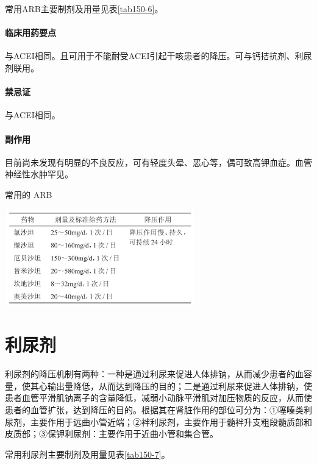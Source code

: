 常用ARB主要制剂及用量见表\ref{tab150-6}。

\paragraph{临床用药要点}

与ACEI相同。且可用于不能耐受ACEI引起干咳患者的降压。可与钙拮抗剂、利尿剂联用。

\paragraph{禁忌证}

与ACEI相同。

\paragraph{副作用}

目前尚未发现有明显的不良反应，可有轻度头晕、恶心等，偶可致高钾血症。血管神经性水肿罕见。

\begin{table}[htbp]
\centering
\caption{常用的 ARB}
\label{tab150-6}
\includegraphics[width=3.25in,height=1.65625in]{./images/Image00562.jpg}
\end{table}

\protect\hypertarget{text00413.html}{}{}

\section{利尿剂}

利尿剂的降压机制有两种：一种是通过利尿来促进人体排钠，从而减少患者的血容量，使其心输出量降低，从而达到降压的目的；二是通过利尿来促进人体排钠，使患者血管平滑肌钠离子的含量降低，减弱小动脉平滑肌对加压物质的反应，从而使患者的血管扩张，达到降压的目的。根据其在肾脏作用的部位可分为：①噻嗪类利尿剂，主要作用于远曲小管近端；②袢利尿剂，主要作用于髓袢升支粗段髓质部和皮质部；③保钾利尿剂：主要作用于近曲小管和集合管。

常用利尿剂主要制剂及用量见表\ref{tab150-7}。

